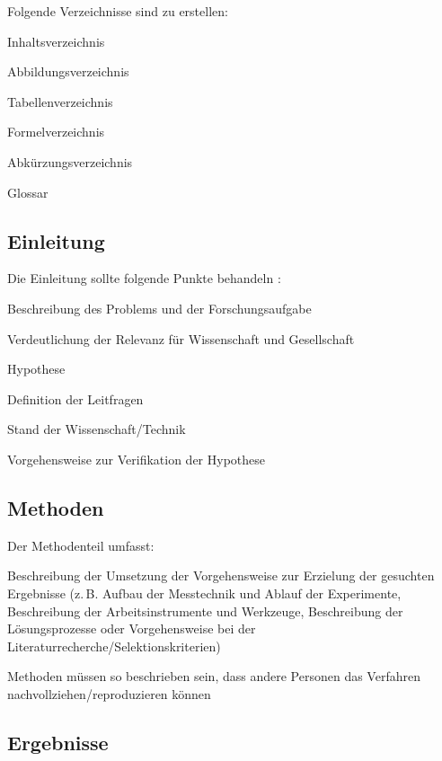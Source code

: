 Folgende Verzeichnisse sind zu erstellen:
\begin{listenabsatz}
	\item Inhaltsverzeichnis
	\item Abbildungsverzeichnis
	\item Tabellenverzeichnis
	\item Formelverzeichnis
	\item Abkürzungsverzeichnis
	\item Glossar
\end{listenabsatz}

\subsection*{Einleitung}
\label{subsec:einleitung_struktur}

Die Einleitung sollte folgende Punkte behandeln \parencite{reiter2011,theisen2013}:
\begin{listenabsatz}
	\item Beschreibung des Problems und der Forschungsaufgabe
	\item Verdeutlichung der Relevanz für Wissenschaft und Gesellschaft
	\item Hypothese
	\item Definition der Leitfragen
	\item Stand der Wissenschaft/Technik
	\item Vorgehensweise zur Verifikation der Hypothese
\end{listenabsatz}

\subsection*{Methoden}
\label{subsec:methoden_struktur}

Der Methodenteil umfasst:
\begin{listenabsatz}
	\item Beschreibung der Umsetzung der Vorgehensweise zur Erzielung der gesuchten Ergebnisse (z.\,B. Aufbau der Messtechnik und Ablauf der Experimente, Beschreibung der Arbeitsinstrumente und Werkzeuge, Beschreibung der Lösungsprozesse oder Vorgehensweise bei der Literaturrecherche/Selektionskriterien)
	\item Methoden müssen so beschrieben sein, dass andere Personen das Verfahren nachvollziehen/reproduzieren können
\end{listenabsatz}

\subsection*{Ergebnisse}
\label{subsec:ergebnisse_struktur}

